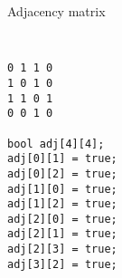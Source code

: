 \documentclass[12pt,t]{beamer}
\begin{document}
\begin{frame}[fragile]{Adjacency matrix}

    \begin{columns}[T]
        \begin{column}{.4\textwidth}
            \begin{verbatim}

0 1 1 0
1 0 1 0
1 1 0 1
0 0 1 0

bool adj[4][4];
adj[0][1] = true;
adj[0][2] = true;
adj[1][0] = true;
adj[1][2] = true;
adj[2][0] = true;
adj[2][1] = true;
adj[2][3] = true;
adj[3][2] = true;
            \end{verbatim}
        \end{column}%
        \hfill%
        \begin{column}{.4\textwidth}
            \begin{figure}
            \end{figure}
        \end{column}%
    \end{columns}
\end{frame}
\end{document}
